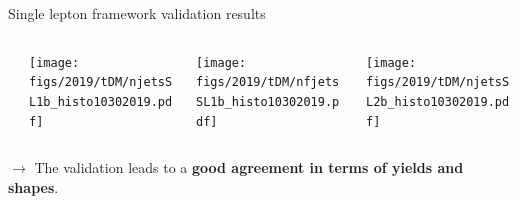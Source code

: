 \documentclass[9pt]{beamer}
\begin{document}
\begin{frame}{\alert{Single lepton} framework validation results}
\begin{columns}
\begin{column}{0.05\textwidth}
		\end{column} \hfill
		\begin{column}{0.32\textwidth}
			\begin{center}
     			\texttt{[image: figs/2019/tDM/njetsSL1b\_histo10302019.pdf]}
    		\end{center}		
		\end{column} \hfill
		\begin{column}{0.32\textwidth}
			\begin{center}
     			\texttt{[image: figs/2019/tDM/nfjetsSL1b\_histo10302019.pdf]}
    		\end{center}		
		\end{column} \hfill
		\begin{column}{0.32\textwidth}
			\begin{center}
     			\texttt{[image: figs/2019/tDM/njetsSL2b\_histo10302019.pdf]}
   			 \end{center}
		\end{column} \hfill
	\end{columns} \vfill
	\vspace{10pt}
	$\rightarrow$ The validation leads to a \textbf{good agreement in terms of yields and shapes}. \vfill \vspace{-10pt}
\end{frame}
\end{document}
